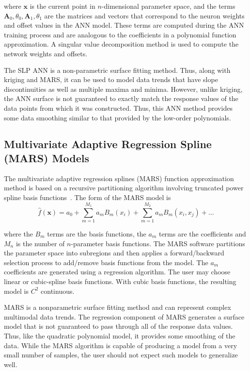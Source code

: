 \documentclass{article}
\begin{document}
where $\mathbf{x}$ is the current point in $n$-dimensional parameter
space, and the terms
$\mathbf{A}_{0},\theta_{0},\mathbf{A}_{1},\theta_{1}$ are the matrices
and vectors that correspond to the neuron weights and offset values in
the ANN model. These terms are computed during the ANN training
process and are analogous to the coefficients in a polynomial function approximation.  A singular value decomposition method is used to compute the network weights and offsets.

The SLP ANN is a non-parametric surface fitting method. Thus, along
with kriging and MARS, it can be used to model data trends that have
slope discontinuities as well as multiple maxima and minima. However,
unlike kriging, the ANN surface is not guaranteed to exactly match the
response values of the data points from which it was constructed.  Thus, this ANN method provides some data smoothing similar to that provided by the low-order polynomials. 

\subsection{Multivariate Adaptive Regression Spline (MARS) Models}\label{models:surf:mars}

The multivariate adaptive regression splines (MARS) function approximation method is based on a recursive partitioning algorithm involving truncated power spline basis functions~\cite{friedman}.  The form of the MARS model is
\begin{equation}
  \hat{f}(\mathbf{x})= a_0 + \sum_{m=1}^{M_1}a_{m}B_{m}(x_i) +  \sum_{m=1}^{M_2}a_{m}B_{m}(x_i,x_j)+\ldots
  \label{models:surf:equation10}  
\end{equation}

where the $B_{m}$ terms are the basis functions, the $a_{m}$ terms are the coefficients and $M_n$ is the number of $n$-parameter basis functions. The MARS software partitions the parameter space into subregions and then
applies a forward/backward selection process to add/remove basis functions from the model.  The $a_m$ coefficients are generated using a regression algorithm.  The user may choose linear or cubic-spline basis functions.  With cubic basis functions, the resulting model is $C^2$ continuous.  

MARS is a nonparametric surface fitting method and can represent
complex multimodal data trends. The regression component of MARS
generates a surface model that is not guaranteed to pass through all
of the response data values. Thus, like the quadratic polynomial
model, it provides some smoothing of the data.  While the MARS algorithm is capable of producing a model from a very small number of samples, the user should not expect such models to generalize well.   
\end{document}
